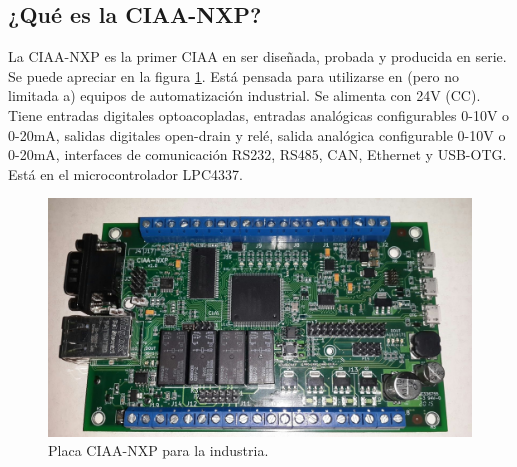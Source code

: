 \subsection{¿Qué es la CIAA-NXP?}

La CIAA-NXP es la primer CIAA en ser diseñada, probada y producida en serie. Se puede apreciar en la figura \ref{fig:ciaaxp}. 
Está pensada para utilizarse en (pero no limitada a) equipos de automatización industrial. Se alimenta con 24V (CC). Tiene entradas digitales optoacopladas, entradas analógicas configurables 0-10V o 0-20mA, salidas digitales open-drain y relé, salida analógica configurable 0-10V o 0-20mA, interfaces de comunicación RS232, RS485, CAN, Ethernet y USB-OTG. Está en el microcontrolador LPC4337. 

\begin{figure}[ht]
  \centering
  \includegraphics[scale=.2]{./Figures/ciaa.png}
  \caption{Placa CIAA-NXP para la industria.}
  \label{fig:ciaaxp}
\end{figure}

